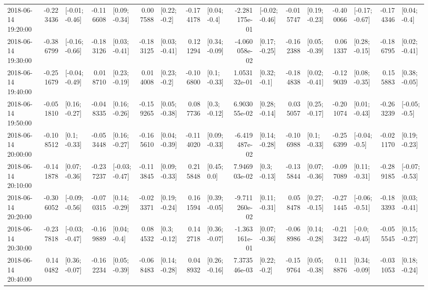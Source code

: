 \begin{tabular}{lrlrlrlrlrlrlrlrl}
2018-06-14 19:20:00 & -0.223436 &  [-0.01; -0.46] & -0.116608 &   [0.09; -0.34] &  0.007588 &    [0.22; -0.2] & -0.174178 &    [0.04; -0.4] & -2.281175e-01 &  [-0.02; -0.46] & -0.015747 &   [0.19; -0.23] & -0.400066 &  [-0.17; -0.67] & -0.174346 &    [0.04; -0.4] \\
2018-06-14 19:30:00 & -0.386799 &  [-0.16; -0.66] & -0.183126 &   [0.03; -0.41] & -0.183125 &   [0.03; -0.41] &  0.121294 &   [0.34; -0.09] & -4.060058e-02 &   [0.17; -0.25] & -0.162388 &   [0.05; -0.39] &  0.061337 &   [0.28; -0.15] & -0.186795 &   [0.02; -0.41] \\
2018-06-14 19:40:00 & -0.251679 &  [-0.04; -0.49] &  0.018710 &   [0.23; -0.19] &  0.014008 &    [0.23; -0.2] & -0.106800 &    [0.1; -0.33] &  1.053132e-01 &    [0.32; -0.1] & -0.184838 &   [0.02; -0.41] & -0.129039 &   [0.08; -0.35] &  0.155883 &   [0.38; -0.05] \\
2018-06-14 19:50:00 & -0.051810 &   [0.16; -0.27] & -0.048335 &   [0.16; -0.26] & -0.159265 &   [0.05; -0.38] &  0.087736 &    [0.3; -0.12] &  6.903055e-02 &   [0.28; -0.14] &  0.035057 &   [0.25; -0.17] & -0.201074 &   [0.01; -0.43] & -0.263239 &   [-0.05; -0.5] \\
2018-06-14 20:00:00 & -0.108512 &    [0.1; -0.33] & -0.053448 &   [0.16; -0.27] & -0.165610 &   [0.04; -0.39] & -0.114020 &   [0.09; -0.33] & -6.419487e-02 &   [0.14; -0.28] & -0.106988 &    [0.1; -0.33] & -0.256399 &   [-0.04; -0.5] & -0.021170 &   [0.19; -0.23] \\
2018-06-14 20:10:00 & -0.141878 &   [0.07; -0.36] & -0.237237 &  [-0.03; -0.47] & -0.113845 &   [0.09; -0.33] &  0.215848 &     [0.45; 0.0] &  7.946903e-02 &    [0.3; -0.13] & -0.135844 &   [0.07; -0.36] & -0.097089 &   [0.11; -0.31] & -0.289185 &  [-0.07; -0.53] \\
2018-06-14 20:20:00 & -0.306052 &  [-0.09; -0.56] & -0.070315 &   [0.14; -0.29] & -0.023371 &   [0.19; -0.24] &  0.161594 &   [0.39; -0.05] & -9.711260e-02 &   [0.11; -0.31] &  0.058478 &   [0.27; -0.15] & -0.271445 &  [-0.06; -0.51] & -0.183393 &   [0.03; -0.41] \\
2018-06-14 20:30:00 & -0.237818 &  [-0.03; -0.47] & -0.169889 &    [0.04; -0.4] &  0.084532 &    [0.3; -0.12] &  0.142718 &   [0.36; -0.07] & -1.363161e-01 &   [0.07; -0.36] & -0.068986 &   [0.14; -0.28] & -0.213422 &   [-0.0; -0.45] & -0.055545 &   [0.15; -0.27] \\
2018-06-14 20:40:00 &  0.140482 &   [0.36; -0.07] & -0.162234 &   [0.05; -0.39] & -0.068483 &   [0.14; -0.28] &  0.048932 &   [0.26; -0.16] &  7.373546e-03 &    [0.22; -0.2] & -0.159764 &   [0.05; -0.38] &  0.118876 &   [0.34; -0.09] & -0.031053 &   [0.18; -0.24] \\

\end{tabular}
